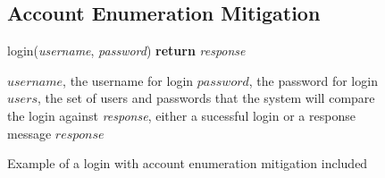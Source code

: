 \documentclass{ueacmpstyle}
\begin{document}
            \begin{figure}[ht]
              \subsection{Account Enumeration Mitigation}
              \label{sec:account-enumeration}
              \centering
              \begin{algorithm}[H]
              \caption{login(\emph{username}, \emph{password}) {\bf return} \emph{response}}
                \begin{algorithmic}[1]
                  \Require $username$, the username for login
                  \Require $password$, the password for login
                  \Require $users$, the set of users and passwords that the system will 
                            compare the login against
                  \Ensure \emph{response}, either a sucessful login or a response message
                      \Else
                      \EndIf
                    \Else
                    \EndIf
                  \EndFor
                  \State \Return $response$
                \end{algorithmic}
              \end{algorithm}
              \caption{Example of a login with account enumeration mitigation included}
              \label{fig:account-enumeration}
          \end{figure}
\end{document}
